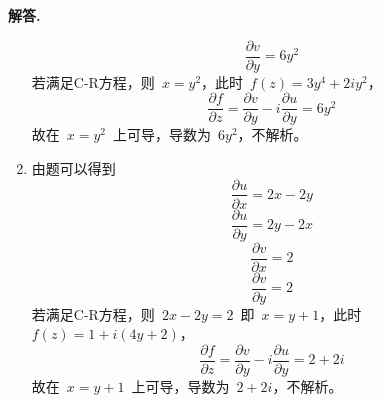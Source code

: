 \documentclass[11pt]{ctexart}
\newenvironment{solution}{\par\noindent\textbf{解答. }}{\par}
\begin{document}
\begin{solution}
\begin{enumerate}[(1)]
\begin{equation*}
                  \dfrac{\partial v}{\partial y} = 6y^2
              \end{equation*}
              若满足C-R方程，则\ $x=y^2$，此时\ $f(z)=3y^4+2iy^2$，
              \begin{equation*}
                  \dfrac{\partial f}{\partial z} = \dfrac{\partial v}{\partial y}-i\dfrac{\partial u}{\partial y} = 6y^2
              \end{equation*}
              故在\ $x=y^2$\ 上可导，导数为\ $6y^2$，不解析。
        \item 由题可以得到
              \begin{equation*}
                  \dfrac{\partial u}{\partial x} = 2x - 2y
              \end{equation*}
              \begin{equation*}
                  \dfrac{\partial u}{\partial y} = 2y - 2x
              \end{equation*}
              \begin{equation*}
                  \dfrac{\partial v}{\partial x} = 2
              \end{equation*}
              \begin{equation*}
                  \dfrac{\partial v}{\partial y} = 2
              \end{equation*}
              若满足C-R方程，则\ $2x-2y=2$\ 即\ $x=y+1$，此时\ $f(z)=1+i(4y+2)$，
              \begin{equation*}
                  \dfrac{\partial f}{\partial z} = \dfrac{\partial v}{\partial y}-i\dfrac{\partial u}{\partial y} = 2 + 2i
              \end{equation*}
              故在\ $x=y+1$\ 上可导，导数为\ $2+2i$，不解析。
    \end{enumerate}
\end{solution}
\end{document}
